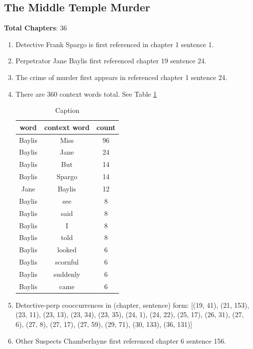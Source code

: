 \documentclass{article}
\begin{document}
\subsection{The Middle Temple Murder}
\textbf{Total Chapters}: 36 \\

\begin{enumerate}
    \item Detective Frank Spargo is first referenced in chapter 1 sentence 1. \\
    \item Perpetrator Jane Baylis first referenced chapter 19 sentence 24.\\
    \item The crime of murder first appears in referenced chapter 1 sentence 24. \\
    \item There are 360 context words total. See Table \ref{tab:mtm} \\
    \begin{table}[]
        \centering
        \begin{tabular}{c|c|c}
        word & context word & count \\ \hline
        Baylis & Miss & 96 \\
Baylis & Jane & 24 \\
Baylis & But & 14 \\
Baylis & Spargo & 14 \\
Jane & Baylis & 12 \\
Baylis & see & 8 \\
Baylis & said & 8 \\
Baylis & I & 8 \\
Baylis & told & 8 \\
Baylis & looked & 6 \\
Baylis & scornful & 6 \\
Baylis & suddenly & 6 \\
Baylis & came & 6 \\
        \end{tabular}
        \caption{Caption}
        \label{tab:mtm}
    \end{table}
    \item Detective-perp cooccurrences in (chapter, sentence) form: [(19, 41), (21, 153), (23, 11), (23, 13), (23, 34), (23, 35), (24, 1), (24, 22), (25, 17), (26, 31), (27, 6), (27, 8), (27, 17), (27, 59), (29, 71), (30, 133), (36, 131)] \\
    \item Other Suspects Chamberlayne first referenced chapter 6 sentence 156. \\
\end{enumerate}
\end{document}
